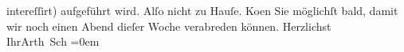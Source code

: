 \begin{ledgroupsized}[t]{13cm}
                    intereſſirt) aufgeführt wird. Alſo nicht {\pb}zu
                    Hauſe. Ko{\geminationm}en Sie möglichſt bald, damit wir noch
                    einen Abend dieſer Woche verabreden können.\pend
           \pstart
           Herzlichst{\\[\baselineskip]}Ihr\spacefill\mbox{Arth Sch}\pend
           \leftskip=0em{}\endnumbering{}\end{ledgroupsized}  \newcommand{\dateiname}{L00080}\newcommand{\titel}{Arthur Schnitzler an Hugo von Hofmannsthal, [12. 3. 1892]}\newcommand{\editorInnen}{Martin Anton Müller und Gerd-Hermann Susen}
      